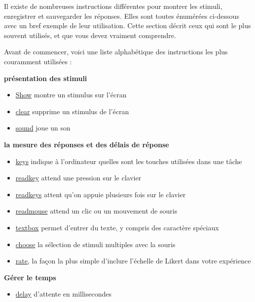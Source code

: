 \documentclass[
]{book}
\providecommand{\tightlist}{%
  \setlength{\itemsep}{0pt}\setlength{\parskip}{0pt}}
\begin{document}
Il existe de nombreuses instructions différentes pour montrer les stimuli, enregistrer et sauvegarder les réponses. Elles sont toutes énumérées ci-dessous avec un bref exemple de leur utilisation. Cette section décrit ceux qui sont le plus souvent utilisés, et que vous devez vraiment comprendre.

Avant de commencer, voici une liste alphabétique des instructions les plus couramment utilisées :

\textbf{présentation des stimuli}

\begin{itemize}
\tightlist
\item
  \protect\hyperlink{task-show}{Show} montre un stimulus sur l'écran
\item
  \protect\hyperlink{task-clear}{clear} supprime un stimulus de l'écran
\item
  \protect\hyperlink{task-sound}{sound} joue un son
\end{itemize}

\textbf{la mesure des réponses et des délais de réponse}

\begin{itemize}
\tightlist
\item
  \protect\hyperlink{task-keys}{keys} indique à l'ordinateur quelles sont les touches utilisées dans une tâche
\item
  \protect\hyperlink{task-readkey}{readkey} attend une pression sur le clavier
\item
  \protect\hyperlink{task-readkeys}{readkeys} attent qu'on appuie plusieurs fois sur le clavier
\item
  \protect\hyperlink{task-readkeys}{readmouse} attend un clic ou un mouvement de souris
\item
  \protect\hyperlink{textbox}{textbox} permet d'entrer du texte, y compris des caractère spéciaux
\item
  \protect\hyperlink{task-choose}{choose} la sélection de stimuli multiples avec la souris
\item
  \protect\hyperlink{task-rate}{rate}, la façon la plus simple d'inclure l'échelle de Likert dans votre expérience
\end{itemize}

\textbf{Gérer le temps}

\begin{itemize}
\tightlist
\item
  \protect\hyperlink{task-delay}{delay} d'attente en millisecondes
\end{itemize}
\end{document}
